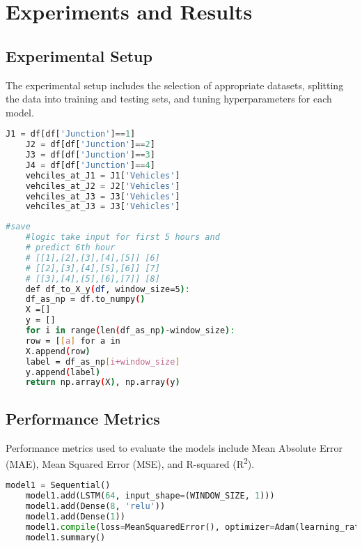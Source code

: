 \chapter{Experiments and Results}

\section{Experimental Setup}

The experimental setup includes the selection of appropriate datasets, splitting the data into training
and testing sets, and tuning hyperparameters for each model.


\begin{lstlisting}[language=Python,caption={Data set fetching using Pandas},label={code:data}]
    J1 = df[df['Junction']==1]
    J2 = df[df['Junction']==2]
    J3 = df[df['Junction']==3]
    J4 = df[df['Junction']==4]
    vehciles_at_J1 = J1['Vehicles']
    vehciles_at_J2 = J2['Vehicles']
    vehciles_at_J3 = J3['Vehicles']
    vehciles_at_J3 = J3['Vehicles']
\end{lstlisting}

\begin{lstlisting}[language=Bash,caption={Sample Result},label={code:confusion matrix}]
    #save
    #logic take input for first 5 hours and
    # predict 6th hour
    # [[1],[2],[3],[4],[5]] [6]
    # [[2],[3],[4],[5],[6]] [7]
    # [[3],[4],[5],[6],[7]] [8]
    def df_to_X_y(df, window_size=5):
    df_as_np = df.to_numpy()
    X =[]
    y = []
    for i in range(len(df_as_np)-window_size):
    row = [[a] for a in
    X.append(row)
    label = df_as_np[i+window_size]
    y.append(label)
    return np.array(X), np.array(y)
\end{lstlisting}

\clearpage

\section{Performance Metrics}

Performance metrics used to evaluate the models include Mean Absolute Error (MAE), Mean Squared Error (MSE), and R-squared (R\textsuperscript{2}).


\begin{lstlisting}[language=Python,caption={Performance Metrics},label={code:data}]
    model1 = Sequential()
    model1.add(LSTM(64, input_shape=(WINDOW_SIZE, 1)))
    model1.add(Dense(8, 'relu'))
    model1.add(Dense(1))
    model1.compile(loss=MeanSquaredError(), optimizer=Adam(learning_rate=0.001), metrics=[RootMeanSquaredError()])
    model1.summary()
\end{lstlisting}




